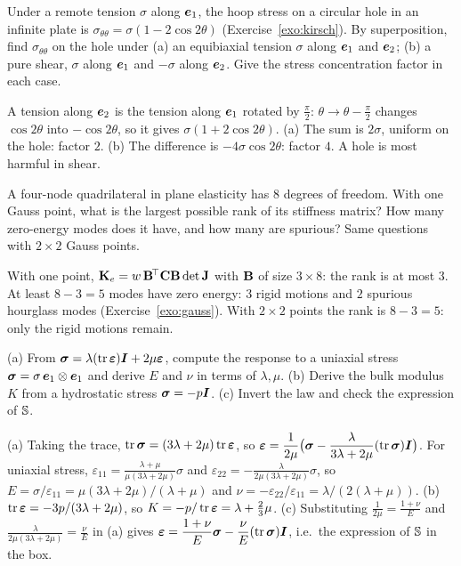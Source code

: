 \label{exo:q-hole}
%
Under a remote tension $\sigma$ along $\bm{e}_1$, the hoop stress on a circular
hole in an infinite plate is $\sigma_{\theta\theta}=\sigma(1-2\cos2\theta)$
(Exercise~\ref{exo:kirsch}). By superposition, find $\sigma_{\theta\theta}$ on
the hole under (a) an equibiaxial tension $\sigma$ along $\bm{e}_1$ and $\bm{e}_2$;
(b) a pure shear, $\sigma$ along $\bm{e}_1$ and $-\sigma$ along $\bm{e}_2$. Give the
stress concentration factor in each case.
\begin{solution}
A tension along $\bm{e}_2$ is the tension along $\bm{e}_1$ rotated by $\tfrac\pi2$:
$\theta\to\theta-\tfrac\pi2$ changes $\cos2\theta$ into $-\cos2\theta$, so
it gives $\sigma(1+2\cos2\theta)$. (a) The sum is $2\sigma$, uniform on the
hole: factor $2$. (b) The difference is $-4\sigma\cos2\theta$: factor $4$. A
hole is most harmful in shear.
\end{solution}

\label{exo:q-modes}
%
A four-node quadrilateral in plane elasticity has $8$ degrees of freedom.
With one Gauss point, what is the largest possible rank of its stiffness
matrix? How many zero-energy modes does it have, and how many are spurious?
Same questions with $2\times2$ Gauss points.
\begin{solution}
With one point, $\mathbf{K}_e=w\,\mathbf{B}^{\!\top}\mathbf{C}\mathbf{B}\det\mathbf{J}$ with $\mathbf{B}$ of
size $3\times8$: the rank is at most $3$. At least $8-3=5$ modes have zero
energy: $3$ rigid motions and $2$ spurious hourglass modes
(Exercise~\ref{exo:gauss}). With $2\times2$ points the rank is $8-3=5$: only
the rigid motions remain.
\end{solution}


\label{exo:lame}
(a) From $\bm{\sigma}=\lambda(\operatorname{tr}\bm{\varepsilon})\bm{I}+2\mu\bm{\varepsilon}$, compute the response to a
uniaxial stress $\bm{\sigma}=\sigma\,\bm{e}_1\otimes\bm{e}_1$ and derive $E$ and $\nu$ in
terms of $\lambda,\mu$. (b) Derive the bulk modulus $K$ from a hydrostatic
stress $\bm{\sigma}=-p\bm{I}$. (c) Invert the law and check the expression of $\mathbb{S}$.
\begin{solution}
(a) Taking the trace, $\operatorname{tr}\bm{\sigma}=(3\lambda+2\mu)\operatorname{tr}\bm{\varepsilon}$, so
$\displaystyle \bm{\varepsilon}=\frac{1}{2\mu}\bigl(\bm{\sigma}-\frac{\lambda}{3\lambda+2\mu}(\operatorname{tr}\bm{\sigma})\bm{I}\bigr)$.
For uniaxial stress, $\displaystyle \varepsilon_{11}=\frac{\lambda+\mu}{\mu(3\lambda+2\mu)}\sigma$
and $\displaystyle \varepsilon_{22}=-\frac{\lambda}{2\mu(3\lambda+2\mu)}\sigma$, so
$E=\sigma/\varepsilon_{11}=\mu(3\lambda+2\mu)/(\lambda+\mu)$ and
$\nu=-\varepsilon_{22}/\varepsilon_{11}=\lambda/(2(\lambda+\mu))$.
(b) $\operatorname{tr}\bm{\varepsilon}=-3p/(3\lambda+2\mu)$, so $K=-p/\operatorname{tr}\bm{\varepsilon}=\lambda+\tfrac23\mu$.
(c) Substituting $\displaystyle \frac1{2\mu}=\frac{1+\nu}{E}$ and
$\displaystyle \frac{\lambda}{2\mu(3\lambda+2\mu)}=\frac{\nu}{E}$ in (a) gives
$\displaystyle \bm{\varepsilon}=\frac{1+\nu}{E}\bm{\sigma}-\frac{\nu}{E}(\operatorname{tr}\bm{\sigma})\bm{I}$, i.e.\ the expression of
$\mathbb{S}$ in the box.
\end{solution}

